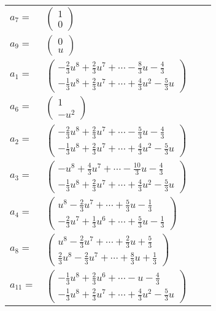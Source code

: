 \documentclass[1p]{elsarticle_modified}
\theoremstyle{definition}
\begin{document}
\begin{tabular}{m{7pt} m{180pt} m{7pt} m{180pt} }
\flushright $a_{7}=$&$\begin{pmatrix}1\\0\end{pmatrix}$ \\
\flushright $a_{9}=$&$\begin{pmatrix}0\\u\end{pmatrix}$ \\
\flushright $a_{1}=$&$\begin{pmatrix}-\frac{2}{3} u^8+\frac{2}{3} u^7+\cdots-\frac{8}{3} u-\frac{4}{3}\\-\frac{1}{3} u^8+\frac{2}{3} u^7+\cdots+\frac{4}{3} u^2-\frac{5}{3} u\end{pmatrix}$ \\
\flushright $a_{6}=$&$\begin{pmatrix}1\\- u^2\end{pmatrix}$ \\
\flushright $a_{2}=$&$\begin{pmatrix}-\frac{2}{3} u^8+\frac{2}{3} u^7+\cdots-\frac{5}{3} u-\frac{4}{3}\\-\frac{1}{3} u^8+\frac{2}{3} u^7+\cdots+\frac{4}{3} u^2-\frac{5}{3} u\end{pmatrix}$ \\
\flushright $a_{3}=$&$\begin{pmatrix}- u^8+\frac{4}{3} u^7+\cdots-\frac{10}{3} u-\frac{4}{3}\\-\frac{1}{3} u^8+\frac{2}{3} u^7+\cdots+\frac{4}{3} u^2-\frac{5}{3} u\end{pmatrix}$ \\
\flushright $a_{4}=$&$\begin{pmatrix}u^8-\frac{2}{3} u^7+\cdots+\frac{5}{3} u-\frac{1}{3}\\-\frac{2}{3} u^7+\frac{1}{3} u^6+\cdots+\frac{5}{3} u-\frac{1}{3}\end{pmatrix}$ \\
\flushright $a_{8}=$&$\begin{pmatrix}u^8-\frac{2}{3} u^7+\cdots+\frac{2}{3} u+\frac{5}{3}\\\frac{2}{3} u^8-\frac{2}{3} u^7+\cdots+\frac{8}{3} u+\frac{1}{3}\end{pmatrix}$ \\
\flushright $a_{11}=$&$\begin{pmatrix}-\frac{1}{3} u^8+\frac{2}{3} u^6+\cdots- u-\frac{4}{3}\\-\frac{1}{3} u^8+\frac{2}{3} u^7+\cdots+\frac{4}{3} u^2-\frac{5}{3} u\end{pmatrix}$ \\

\end{tabular}
\end{document}

